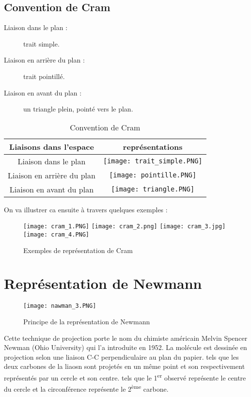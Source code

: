 \documentclass[a4paper, oneside]{book}
\begin{document}
\subsection{Convention de Cram}
\begin{description}
    \item[Liaison dans le plan :] trait simple.
    \item[Liaison en arrière du plan :] trait pointillé.
    \item[Liaison en avant du plan :] un triangle plein, pointé vers le plan.
\end{description}
\begin{table}[!h]
    \centering
    \begin{tabular}{|c|c|}
        \hline
        Liaisons dans l'espace & représentations  \\
        \hline
        Liaison dans le plan & \texttt{[image: trait\_simple.PNG]} \\ 
        \hline
        Liaison en arrière du plan & \texttt{[image: pointille.PNG]}\\
        \hline
        Liaison en avant du plan & \texttt{[image: triangle.PNG]}\\
        \hline
    \end{tabular}
    \caption{Convention de Cram}
    \label{tab:my_label}
\end{table}

On va illustrer ca ensuite à travers quelques exemples :
\begin{figure}[!h]
    \centering
    \texttt{[image: cram\_1.PNG]}
    \texttt{[image: cram\_2.png]}
    \texttt{[image: cram\_3.jpg]}
    \texttt{[image: cram\_4.PNG]}
    \caption{Exemples de représentation de Cram}
    \label{fig:my_label}
\end{figure}
\section{Représentation de Newmann}
\begin{figure}[!h]
    \centering
    \texttt{[image: nawman\_3.PNG]}
    \caption{Principe de la représentation de Newmann}
    \label{fig:my_label}
\end{figure}
Cette technique de projection porte le nom du chimiste américain Melvin Spencer Newman (Ohio University) qui l'a introduite en 1952. La molécule est dessinée en projection selon une liaison C-C perpendiculaire au plan du papier. tels que les deux carbones de la liaosn sont projetés en un même point et son respectivement représentés par un cercle et son centre. tels que le 1\textsuperscript{er} observé représente le centre du cercle et la circonférence représente le 2\textsuperscript{ème} carbone. 
\end{document}
